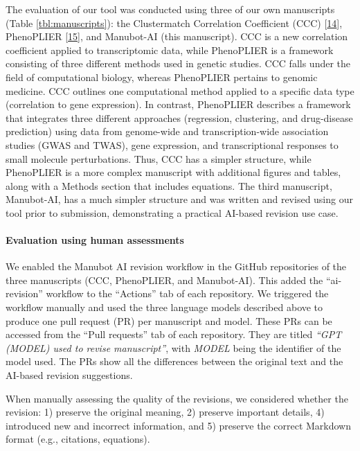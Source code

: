 \documentclass[
]{article}
\begin{document}
The evaluation of our tool was conducted using three of our own manuscripts (Table \ref{tbl:manuscripts}): the Clustermatch Correlation Coefficient (CCC) {[}\protect\hyperlink{ref-eirYTTyk}{14}{]}, PhenoPLIER {[}\protect\hyperlink{ref-NM3rHx1i}{15}{]}, and Manubot-AI (this manuscript).
CCC is a new correlation coefficient applied to transcriptomic data, while PhenoPLIER is a framework consisting of three different methods used in genetic studies.
CCC falls under the field of computational biology, whereas PhenoPLIER pertains to genomic medicine.
CCC outlines one computational method applied to a specific data type (correlation to gene expression).
In contrast, PhenoPLIER describes a framework that integrates three different approaches (regression, clustering, and drug-disease prediction) using data from genome-wide and transcription-wide association studies (GWAS and TWAS), gene expression, and transcriptional responses to small molecule perturbations.
Thus, CCC has a simpler structure, while PhenoPLIER is a more complex manuscript with additional figures and tables, along with a Methods section that includes equations.
The third manuscript, Manubot-AI, has a much simpler structure and was written and revised using our tool prior to submission, demonstrating a practical AI-based revision use case.

\hypertarget{evaluation-using-human-assessments}{%
\paragraph{Evaluation using human assessments}\label{evaluation-using-human-assessments}}

We enabled the Manubot AI revision workflow in the GitHub repositories of the three manuscripts (CCC, PhenoPLIER, and Manubot-AI).
This added the ``ai-revision'' workflow to the ``Actions'' tab of each repository.
We triggered the workflow manually and used the three language models described above to produce one pull request (PR) per manuscript and model.
These PRs can be accessed from the ``Pull requests'' tab of each repository.
They are titled \emph{``GPT (MODEL) used to revise manuscript''}, with \emph{MODEL} being the identifier of the model used.
The PRs show all the differences between the original text and the AI-based revision suggestions.

When manually assessing the quality of the revisions, we considered whether the revision:
1) preserve the original meaning,
2) preserve important details,
4) introduced new and incorrect information, and
5) preserve the correct Markdown format (e.g., citations, equations).
\end{document}
